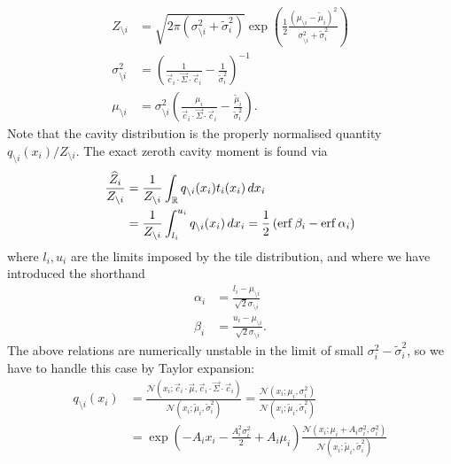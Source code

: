 \documentclass[11pt,twoside]{report}
\begin{document}
\begin{align}
  Z_{\setminus i}
  &=
  \sqrt{2 \pi (\sigma_{\setminus i}^2 + \widetilde{\sigma}_i^2)}
  \exp{\left(
    \frac{1}{2}
    \frac{(\mu_{\setminus i} - \widetilde{\mu}_i)^2}{\sigma_{\setminus i}^2 + \widetilde{\sigma}_i^2}
    \right)}
        \\
  \sigma_{\setminus i}^2 &= \left(
  \frac{1}{\vec{c}_i \cdot \vec{\Sigma} \cdot \vec{c}_i} - \frac{1}{\widetilde{\sigma}_i^2}
  \right)^{-1} \\
  \mu_{\setminus i} &= \sigma_{\setminus i}^2 \left(
  \frac{\mu_i}{\vec{c}_i \cdot \vec{\Sigma} \cdot \vec{c}_i} - \frac{\widetilde{\mu}_i}{\widetilde{\sigma}_i^2}
  \right).
\end{align}
Note that the cavity distribution is the properly normalised quantity $q_{\setminus i}(x_i) / Z_{\setminus i}$.
The exact zeroth cavity moment is found via \cite{Cunningham2011}
\begin{equation}\label{eq:exact-zeroth-moment}
  \begin{split}
    \frac{\widehat{Z}_i}{Z_{\setminus i}}
    &=
    \frac{1}{Z_{\setminus i}}
    \int_{\mathbb{R}} q_{\setminus i}(x_i) t_i(x_i) \, dx_i
    \\ &=
    \frac{1}{Z_{\setminus i}}
    \int_{l_i}^{u_i} q_{\setminus i}(x_i) \, dx_i
    =
    \frac{1}{2} \left( \operatorname{erf}{\beta_i} - \operatorname{erf}{\alpha_i} \right)
  \end{split}
\end{equation}
where $l_i, u_i$ are the limits imposed by the tile distribution, and where we have introduced the shorthand
\begin{align}
  \alpha_i &= \frac{l_i - \mu_{\setminus i}}{\sqrt{2} \sigma_{\setminus i}} \\
  \beta_i &= \frac{u_i - \mu_{\setminus i}}{\sqrt{2} \sigma_{\setminus i}}.
\end{align}
The above relations are numerically unstable in the limit of small $\sigma_i^2 - \widetilde{\sigma}_i^2$, so we have to handle this case by Taylor expansion:
\begin{align}
  q_{\setminus i}(x_i) &=
  \frac{
    \mathcal{N}(x_i; \vec{c}_i \cdot \vec{\mu}, \vec{c}_i \cdot \vec{\Sigma} \cdot \vec{c}_i)
  }{
    \mathcal{N}(x_i; \widetilde{\mu}_i, \widetilde{\sigma}_i^2)
  }
  =
  \frac{\mathcal{N}(x_i; \mu_i, \sigma_i^2)}{
    \mathcal{N}(x_i; \widetilde{\mu}_i, \widetilde{\sigma}_i^2)
  }
  \nonumber \\ &=
  \exp{\left(-A_i x_i
    - \frac{A_i^2 \sigma_i^2}{2}
    + A_i \mu_i
    \right)}
  \frac{\mathcal{N}(x_i; \mu_i + A_i \sigma_i^2, \sigma_i^2)}{
    \mathcal{N}(x_i; \widetilde{\mu}_i, \widetilde{\sigma}_i^2)
  }
\end{align}
\end{document}
